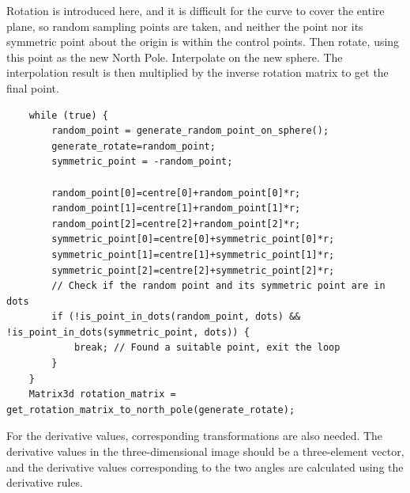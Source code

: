 \documentclass[a4paper]{article}
\begin{document}
Rotation is introduced here, and it is difficult for the curve to cover the entire plane, so random sampling points are taken, and neither the point nor its symmetric point about the origin is within the control points.
Then rotate, using this point as the new North Pole.
Interpolate on the new sphere.
The interpolation result is then multiplied by the inverse rotation matrix to get the final point.

\begin{verbatim}
    while (true) {
        random_point = generate_random_point_on_sphere();
        generate_rotate=random_point;
        symmetric_point = -random_point;

        random_point[0]=centre[0]+random_point[0]*r;
        random_point[1]=centre[1]+random_point[1]*r;
        random_point[2]=centre[2]+random_point[2]*r;
        symmetric_point[0]=centre[0]+symmetric_point[0]*r;
        symmetric_point[1]=centre[1]+symmetric_point[1]*r;
        symmetric_point[2]=centre[2]+symmetric_point[2]*r;
        // Check if the random point and its symmetric point are in dots
        if (!is_point_in_dots(random_point, dots) && !is_point_in_dots(symmetric_point, dots)) {
            break; // Found a suitable point, exit the loop
        }
    }
    Matrix3d rotation_matrix = get_rotation_matrix_to_north_pole(generate_rotate);
\end{verbatim}

For the derivative values, corresponding transformations are also needed. The derivative values in the three-dimensional image should be a three-element vector, and the derivative values corresponding to the two angles are calculated using the derivative rules.
\end{document}
